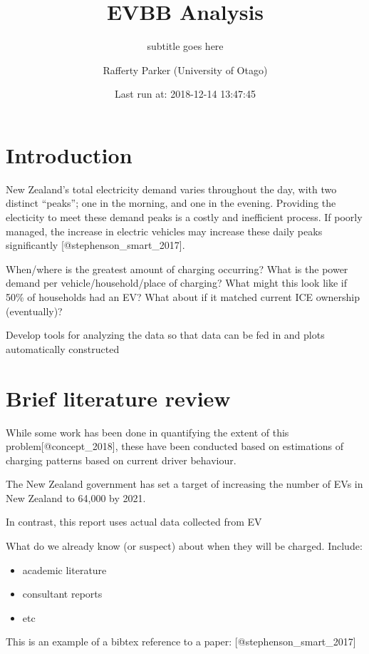 \documentclass[]{article}
\title{EVBB Analysis}
\subtitle{subtitle goes here}
\author{Rafferty Parker (University of Otago)}
\date{Last run at: 2018-12-14 13:47:45}
\providecommand{\tightlist}{%
  \setlength{\itemsep}{0pt}\setlength{\parskip}{0pt}}
\begin{document}
\maketitle

{
\setcounter{tocdepth}{2}
\tableofcontents
}
\section{Introduction}\label{introduction}

New Zealand's total electricity demand varies throughout the day, with
two distinct ``peaks''; one in the morning, and one in the evening.
Providing the electicity to meet these demand peaks is a costly and
inefficient process. If poorly managed, the increase in electric
vehicles may increase these daily peaks significantly
{[}@stephenson\_smart\_2017{]}.

When/where is the greatest amount of charging occurring? What is the
power demand per vehicle/household/place of charging? What might this
look like if 50\% of households had an EV? What about if it matched
current ICE ownership (eventually)?

Develop tools for analyzing the data so that data can be fed in and
plots automatically constructed

\section{Brief literature review}\label{brief-literature-review}

While some work has been done in quantifying the extent of this
problem{[}@concept\_2018{]}, these have been conducted based on
estimations of charging patterns based on current driver behaviour.

The New Zealand government has set a target of increasing the number of
EVs in New Zealand to 64,000 by 2021.

In contrast, this report uses actual data collected from EV

What do we already know (or suspect) about when they will be charged.
Include:

\begin{itemize}
\tightlist
\item
  academic literature
\item
  consultant reports
\item
  etc
\end{itemize}

This is an example of a bibtex reference to a paper:
{[}@stephenson\_smart\_2017{]}
\end{document}

